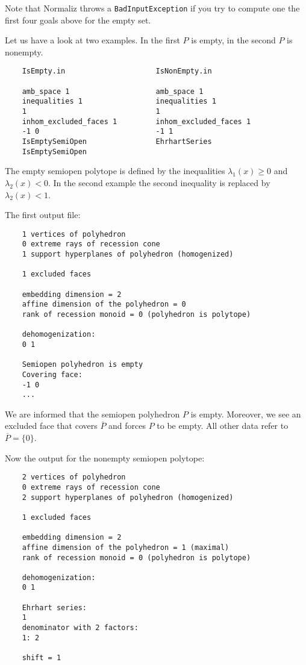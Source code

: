 \documentclass[12pt,a4paper]{scrartcl}
\theoremstyle{definition}
\begin{document}
{	Note that Normaliz throws a  \verb|BadInputException| if you try to compute one the first four goals above for the empty set.
	
	Let us have a look at two examples. In the first $P$ is empty, in the second $P$ is nonempty.
	\begin{Verbatim}
	IsEmpty.in                     IsNonEmpty.in
	
	amb_space 1                    amb_space 1
	inequalities 1                 inequalities 1
	1                              1
	inhom_excluded_faces 1         inhom_excluded_faces 1
	-1 0                           -1 1
	IsEmptySemiOpen                EhrhartSeries
	IsEmptySemiOpen
	\end{Verbatim}
	
	The empty semiopen polytope is defined by the inequalities $\lambda_1(x) \ge 0$ and $\lambda_2(x) < 0$. In the second example the second inequality is replaced by $\lambda_2(x) < 1$. 
	
	The first output file:
	\begin{Verbatim}
	1 vertices of polyhedron
	0 extreme rays of recession cone
	1 support hyperplanes of polyhedron (homogenized)
	
	1 excluded faces
	
	embedding dimension = 2
	affine dimension of the polyhedron = 0
	rank of recession monoid = 0 (polyhedron is polytope)
	
	dehomogenization:
	0 1 
	
	Semiopen polyhedron is empty
	Covering face:
	-1 0 
	...
	\end{Verbatim}
	We are informed that the semiopen polyhedron $P$ is empty. Moreover, we see an excluded face that covers $\overline P$ and forces $P$ to be empty.  All other data refer to $\overline P=\{0\}$.
	
	Now the output for the nonempty semiopen polytope:
	\begin{Verbatim}
	2 vertices of polyhedron
	0 extreme rays of recession cone
	2 support hyperplanes of polyhedron (homogenized)
	
	1 excluded faces
	
	embedding dimension = 2
	affine dimension of the polyhedron = 1 (maximal)
	rank of recession monoid = 0 (polyhedron is polytope)
	
	dehomogenization:
	0 1 
	
	Ehrhart series:
	1 
	denominator with 2 factors:
	1: 2  
	
	shift = 1
	

\end{Verbatim}}
\end{document}
